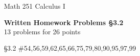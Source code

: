 \documentclass[11pt]{report}
\theoremstyle{plain}
\begin{document}
\hfill Math 251 Calculus I
\begin{center}
\Large{\textbf{Written Homework Problems \S 3.2}} \\
13 problems for 26 points\\
\end{center}

\begin{description}
\item{\S 3.2} \#54,56,59,62,65,66,75,79,80,90,95,97,99

\end{description}
\end{document}
